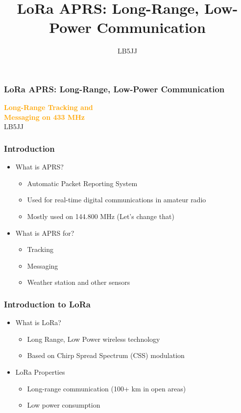 \documentclass[aspectratio=169]{beamer}
\title[LoRa APRS: Long-Range, Low-Power Communication]{LoRa APRS: Long-Range, Low-Power Communication}
\author{LB5JJ}
\begin{document}
\begin{frame}
  \frametitle{LoRa APRS: Long-Range, Low-Power Communication}
  \begin{center}
    {\Huge \textbf{\textcolor{orange}{Long-Range Tracking and\\Messaging on 433 MHz}}} \\[1cm]
    {\Large \textcolor{light}{LB5JJ}}
  \end{center}
\end{frame}

\begin{frame}[t]
  \frametitle{Introduction}
  \begin{itemize}
    \item What is APRS?
    \medskip
    \begin{itemize}
      \item Automatic Packet Reporting System
      \medskip
      \item Used for real-time digital communications in amateur radio
      \medskip
      \item Mostly used on 144.800 MHz (Let's change that)
    \end{itemize}
    \medskip
    \item What is APRS for?
    \medskip
    \begin{itemize}
      \item Tracking
      \medskip
      \item Messaging
      \medskip
      \item Weather station and other sensors
    \end{itemize}
  \end{itemize}
\end{frame}

\begin{frame}[t]
  \frametitle{Introduction to LoRa}
  \begin{itemize}
    \item What is LoRa?
    \medskip
    \begin{itemize}
      \item Long Range, Low Power wireless technology
      \medskip
      \item Based on Chirp Spread Spectrum (CSS) modulation
    \end{itemize}
    \medskip
    \item LoRa Properties
    \medskip
    \begin{itemize}
      \item Long-range communication (100+ km in open areas)
      \medskip
      \item Low power consumption
    \end{itemize}
  \end{itemize}
\end{frame}
\end{document}
